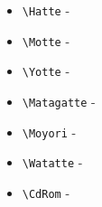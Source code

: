\documentclass[oneside,10pt,a4paper]{jsarticle}
\begin{document}
\begin{itemize}
    \item \verb|\Hatte| - 
    \item \verb|\Motte| - 
    \item \verb|\Yotte| - 
    \item \verb|\Matagatte| - 
    \item \verb|\Moyori| - 
    \item \verb|\Watatte| - 
    \item \verb|\CdRom| - 
  \end{itemize}

\end{document}

